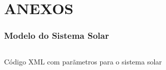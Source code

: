 \appendix

\part*{ANEXOS}

\section{Modelo do Sistema Solar}
\label{appendix:a}
\begin{longlisting}
	\inputminted{xml}{resources/sistema.xml}
	\caption{Código XML com parãmetros para o sistema solar}
\label{listing:b}
\end{longlisting}

